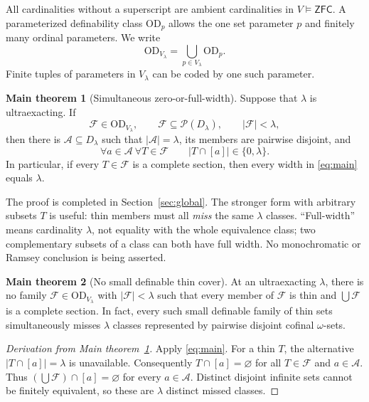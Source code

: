 \documentclass[11pt,letterpaper]{article}
\theoremstyle{definition}
\numberwithin{equation}{section}
\newcommand{\ZFC}{\mathsf{ZFC}}
\newcommand{\OD}{\mathrm{OD}}
\newcommand{\Pow}{\mathcal P}
\newcommand{\FF}{\mathcal F}
\newcommand{\calA}{\mathcal A}
\newtheorem{maintheorem}{Main theorem}
\begin{document}
All cardinalities without a superscript are ambient cardinalities in $V\models\ZFC$. A parameterized definability class $\OD_p$ allows the one set parameter $p$ and finitely many ordinal parameters. We write
\[
 \OD_{V_\lambda}=\bigcup_{p\in V_\lambda}\OD_p.
\]
Finite tuples of parameters in $V_\lambda$ can be coded by one such parameter.

\begin{maintheorem}[Simultaneous zero-or-full-width]\label{thm:main}
Suppose that $\lambda$ is ultraexacting. If
\[
 \FF\in\OD_{V_\lambda},\qquad
 \FF\subseteq\Pow(D_\lambda),\qquad |\FF|<\lambda,
\]
then there is $\calA\subseteq D_\lambda$ such that $|\calA|=\lambda$, its members are pairwise disjoint, and
\begin{equation}\label{eq:main}
 \forall a\in\calA\ \forall T\in\FF\qquad
       |T\cap[a]|\in\{0,\lambda\}.
\end{equation}
In particular, if every $T\in\FF$ is a complete section, then every width in \eqref{eq:main} equals $\lambda$.
\end{maintheorem}

The proof is completed in Section~\ref{sec:global}. The stronger form with arbitrary subsets $T$ is useful: thin members must all \emph{miss} the same $\lambda$ classes. ``Full-width'' means cardinality $\lambda$, not equality with the whole equivalence class; two complementary subsets of a class can both have full width. No monochromatic or Ramsey conclusion is being asserted.

\begin{maintheorem}[No small definable thin cover]\label{thm:thincover}
At an ultraexacting $\lambda$, there is no family $\FF\in\OD_{V_\lambda}$ with $|\FF|<\lambda$ such that every member of $\FF$ is thin and $\bigcup\FF$ is a complete section. In fact, every such small definable family of thin sets simultaneously misses $\lambda$ classes represented by pairwise disjoint cofinal $\omega$-sets.
\end{maintheorem}

\begin{proof}[Derivation from Main theorem~\ref{thm:main}]
Apply \eqref{eq:main}. For a thin $T$, the alternative $|T\cap[a]|=\lambda$ is unavailable. Consequently $T\cap[a]=\varnothing$ for all $T\in\FF$ and $a\in\calA$. Thus $(\bigcup\FF)\cap[a]=\varnothing$ for every $a\in\calA$. Distinct disjoint infinite sets cannot be finitely equivalent, so these are $\lambda$ distinct missed classes.
\end{proof}
\end{document}
